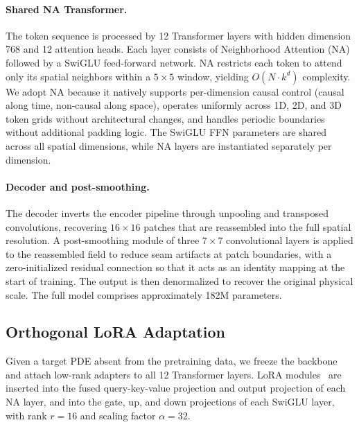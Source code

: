 \documentclass{article}
\begin{document}
\paragraph{Shared NA Transformer.}
The token sequence is processed by 12 Transformer layers with hidden dimension 768 and 12 attention heads. Each layer consists of Neighborhood Attention (NA)~\cite{hassani2023neighborhood} followed by a SwiGLU feed-forward network. NA restricts each token to attend only its spatial neighbors within a $5 \times 5$ window, yielding $O(N \cdot k^d)$ complexity. We adopt NA because it natively supports per-dimension causal control (causal along time, non-causal along space), operates uniformly across 1D, 2D, and 3D token grids without architectural changes, and handles periodic boundaries without additional padding logic. The SwiGLU FFN parameters are shared across all spatial dimensions, while NA layers are instantiated separately per dimension.

\paragraph{Decoder and post-smoothing.}
The decoder inverts the encoder pipeline through unpooling and transposed convolutions, recovering $16 \times 16$ patches that are reassembled into the full spatial resolution. A post-smoothing module of three $7 \times 7$ convolutional layers is applied to the reassembled field to reduce seam artifacts at patch boundaries, with a zero-initialized residual connection so that it acts as an identity mapping at the start of training. The output is then denormalized to recover the original physical scale. The full model comprises approximately 182M parameters.

\subsection{Orthogonal LoRA Adaptation}
\label{sec:orthlora}

Given a target PDE absent from the pretraining data, we freeze the backbone and attach low-rank adapters to all 12 Transformer layers. LoRA modules~\cite{hu2022lora} are inserted into the fused query-key-value projection and output projection of each NA layer, and into the gate, up, and down projections of each SwiGLU layer, with rank $r\!=\!16$ and scaling factor $\alpha\!=\!32$.
\end{document}
